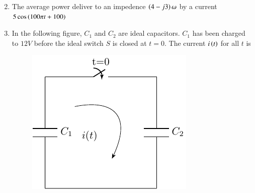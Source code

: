 \documentclass[journal]{IEEEtran}
\begin{document}
\begin{enumerate}
\begin{enumerate}
\begin{multicols}{2}
				\end{multicols}
		\end{enumerate}
	\item The average power deliver to an impedence $\left(4-j3\right)\omega$ by a current $5\cos{\ensuremath{\left(100\pi t+100\right)}}$
\begin{enumerate}
	\begin{multicols}{2}
		\item  $44.2 W$
		 \columnbreak
		\item  $50W$
    \end{multicols}
\end{enumerate}
\item In the following figure, $C_1$ and $C_2$ are ideal capacitors. $C_1$ has been charged to $12V$ before the ideal switch $S$ is closed at $t=0$. The current $i\left(t\right)$ for all $t$ is
\begin{figure}[H]
			\centering
			\includegraphics[scale=0.75]{figs/q17.png}
			\label{stemplot}
		\end{figure}
	\begin{enumerate}

\end{enumerate}
\end{enumerate}
\end{document}
